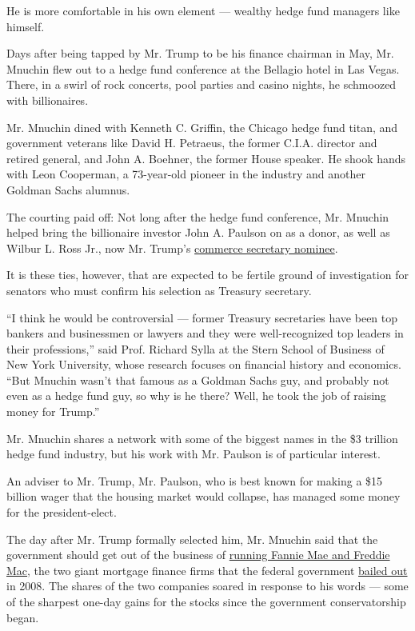 He is more comfortable in his own element --- wealthy hedge fund
managers like himself.

Days after being tapped by Mr. Trump to be his finance chairman in May,
Mr. Mnuchin flew out to a hedge fund conference at the Bellagio hotel in
Las Vegas. There, in a swirl of rock concerts, pool parties and casino
nights, he schmoozed with billionaires.

Mr. Mnuchin dined with Kenneth C. Griffin, the Chicago hedge fund titan,
and government veterans like David H. Petraeus, the former C.I.A.
director and retired general, and John A. Boehner, the former House
speaker. He shook hands with Leon Cooperman, a 73-year-old pioneer in
the industry and another Goldman Sachs alumnus.

The courting paid off: Not long after the hedge fund conference, Mr.
Mnuchin helped bring the billionaire investor John A. Paulson on as a
donor, as well as Wilbur L. Ross Jr., now Mr. Trump's
\href{https://www.nytimes.com/2016/11/30/business/dealbook/trumps-economic-cabinet-picks-signal-embrace-of-wall-st-elite.html}{commerce
secretary nominee}.

It is these ties, however, that are expected to be fertile ground of
investigation for senators who must confirm his selection as Treasury
secretary.

``I think he would be controversial --- former Treasury secretaries have
been top bankers and businessmen or lawyers and they were
well-recognized top leaders in their professions,'' said Prof. Richard
Sylla at the Stern School of Business of New York University, whose
research focuses on financial history and economics. ``But Mnuchin
wasn't that famous as a Goldman Sachs guy, and probably not even as a
hedge fund guy, so why is he there? Well, he took the job of raising
money for Trump.''

Mr. Mnuchin shares a network with some of the biggest names in the \$3
trillion hedge fund industry, but his work with Mr. Paulson is of
particular interest.

An adviser to Mr. Trump, Mr. Paulson, who is best known for making a
\$15 billion wager that the housing market would collapse, has managed
some money for the president-elect.

The day after Mr. Trump formally selected him, Mr. Mnuchin said that the
government should get out of the business of
\href{http://www.foxbusiness.com/politics/2016/11/30/steve-mnuchin-time-to-jettison-fannie-mae-freddie-mac.html}{running
Fannie Mae and Freddie Mac}, the two giant mortgage finance firms that
the federal government
\href{http://www.nytimes.com/2008/09/08/business/08takeover.html}{bailed
out} in 2008. The shares of the two companies soared in response to his
words --- some of the sharpest one-day gains for the stocks since the
government conservatorship began.

